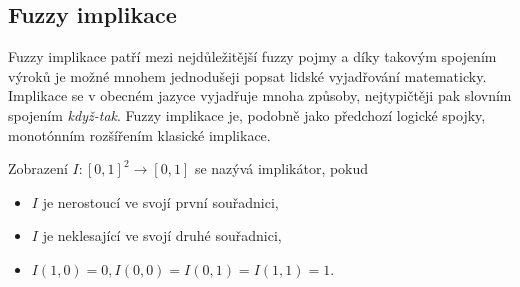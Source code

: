 \begin{graph}
\end{graph}

\subsection{Fuzzy implikace} 

Fuzzy implikace patří mezi nejd\r uležitější fuzzy pojmy a díky takovým spojením výrok\r u je možné mnohem jednodušeji popsat lidské vyjadřování matematicky. Implikace se v obecném jazyce vyjadřuje mnoha zp\r usoby, nejtypičtěji pak slovním spojením \textit{když-tak}. Fuzzy implikace je, podobn\v e jako p\v redchoz\'i logick\'e spojky, monot\'onn\'im roz\v s\'i\v ren\'im klasick\'e implikace.
\begin{definition}
    Zobrazení $I: [0,1]^2 \rightarrow [0,1] $ se nazývá implikátor, pokud
    \begin{itemize}
        \item $I$ je nerostoucí ve svojí první souřadnici,
        \item $I$ je neklesající ve svojí druhé souřadnici,
        \item $I(1,0) = 0, I(0,0) =  I(0,1) = I(1,1) = 1.$
    \end{itemize}
\end{definition}

